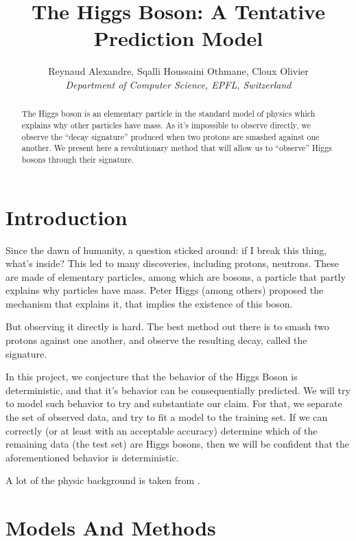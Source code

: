 \documentclass[10pt,conference,compsocconf]{IEEEtran}
\begin{document}
\title{The Higgs Boson: A Tentative Prediction Model}

\author{
  Reynaud Alexandre, Sqalli Houssaini Othmane, Cloux Olivier\\
  \textit{Department of Computer Science, EPFL, Switzerland}
}

\maketitle

\begin{abstract}
The Higgs boson is an elementary particle in the standard model of physics which explains why other particles have mass. As it's impossible to observe directly, we observe the ``decay signature'' produced when two protons are smashed against one another. We present here a revolutionary method that will allow us to ``observe'' Higgs bosons through their signature.
\end{abstract}

\section{Introduction}
Since the dawn of humanity, a question sticked around: if I break this thing, what's inside? This led to many discoveries, including protons, neutrons. These are made of elementary particles\cite{elementPart}, among which are bosons, a particle that partly explains why particles have mass. Peter Higgs (among others) proposed the mechanism that explains it, that implies the existence of this boson.

But observing it directly is hard. The best method out there is to smash two protons against one another, and observe the resulting decay, called the signature.

In this project, we conjecture that the behavior of the Higgs Boson is deterministic, and that it's behavior can be consequentially predicted. We will try to model such behavior to try and substantiate our claim. For that, we separate the set of observed data, and try to fit a model to the training set. If we can correctly (or at least with an acceptable accuracy) determine which of the remaining data (the test set) are Higgs bosons, then we will be confident that the aforementioned behavior is deterministic.

A lot of the physic background is taken from \cite{higgsBoson}.
\section{Models And Methods}
\end{document}
